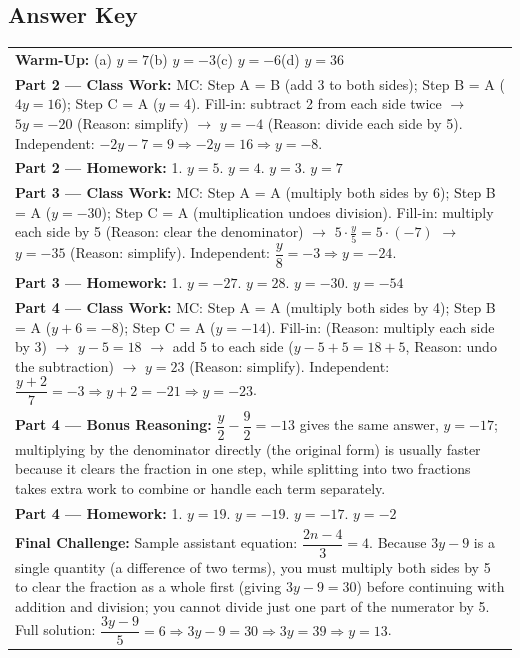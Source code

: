 \documentclass[11pt]{article}
\begin{document}
\subsection*{Answer Key}
{\small
\begin{tabularx}{\linewidth}{@{}X@{}}
\textbf{Warm-Up:} (a) $y=7$\quad (b) $y=-3$\quad (c) $y=-6$\quad (d) $y=36$\\[2mm]

\textbf{Part 2 --- Class Work:} MC: Step A = B (add 3 to both sides); Step B = A ($4y=16$); Step C = A ($y=4$). \quad Fill-in: subtract 2 from each side twice $\to$ $5y=-20$ (Reason: simplify) $\to$ $y=-4$ (Reason: divide each side by 5). \quad Independent: $-2y-7=9 \Rightarrow -2y=16 \Rightarrow y=-8$.\\[1mm]
\textbf{Part 2 --- Homework:} 1. $y=5$\quad 2. $y=4$\quad 3. $y=3$\quad 4. $y=7$\\[2mm]

\textbf{Part 3 --- Class Work:} MC: Step A = A (multiply both sides by 6); Step B = A ($y=-30$); Step C = A (multiplication undoes division). \quad Fill-in: multiply each side by 5 (Reason: clear the denominator) $\to$ $5\cdot\frac{y}{5}=5\cdot(-7)$ $\to$ $y=-35$ (Reason: simplify). \quad Independent: $\dfrac{y}{8}=-3 \Rightarrow y=-24$.\\[1mm]
\textbf{Part 3 --- Homework:} 1. $y=-27$\quad 2. $y=28$\quad 3. $y=-30$\quad 4. $y=-54$\\[2mm]

\textbf{Part 4 --- Class Work:} MC: Step A = A (multiply both sides by 4); Step B = A ($y+6=-8$); Step C = A ($y=-14$). \quad Fill-in: (Reason: multiply each side by 3) $\to$ $y-5=18$ $\to$ add 5 to each side ($y-5+5=18+5$, Reason: undo the subtraction) $\to$ $y=23$ (Reason: simplify). \quad Independent: $\dfrac{y+2}{7}=-3 \Rightarrow y+2=-21 \Rightarrow y=-23$.\\[1mm]
\textbf{Part 4 --- Bonus Reasoning:} $\dfrac{y}{2}-\dfrac{9}{2}=-13$ gives the same answer, $y=-17$; multiplying by the denominator directly (the original form) is usually faster because it clears the fraction in one step, while splitting into two fractions takes extra work to combine or handle each term separately.\\[1mm]
\textbf{Part 4 --- Homework:} 1. $y=19$\quad 2. $y=-19$\quad 3. $y=-17$\quad 4. $y=-2$\\[2mm]

\textbf{Final Challenge:} Sample assistant equation: $\dfrac{2n-4}{3}=4$. Because $3y-9$ is a single quantity (a difference of two terms), you must multiply both sides by 5 to clear the fraction as a whole first (giving $3y-9=30$) before continuing with addition and division; you cannot divide just one part of the numerator by 5. Full solution: $\dfrac{3y-9}{5}=6 \Rightarrow 3y-9=30 \Rightarrow 3y=39 \Rightarrow y=13$.
\end{tabularx}
}
\end{document}
